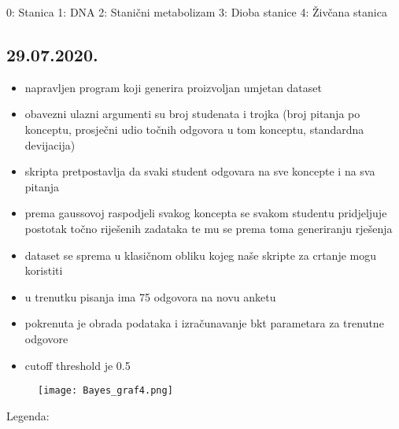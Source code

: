 		0: Stanica
		1: DNA
		2: Stanični metabolizam
		3: Dioba stanice
		4: Živčana stanica

		\subsection{29.07.2020.}
		\begin{itemize}
			\item napravljen program koji generira proizvoljan umjetan dataset
			\item obavezni ulazni argumenti su broj studenata i trojka (broj pitanja po konceptu, prosječni udio točnih odgovora u tom konceptu, standardna devijacija)
			\item skripta pretpostavlja da svaki student odgovara na sve koncepte i na sva pitanja
			\item prema gaussovoj raspodjeli svakog koncepta se svakom studentu pridjeljuje postotak točno riješenih zadataka te mu se prema toma generiranju rješenja
			\item dataset se sprema u klasičnom obliku kojeg naše skripte za crtanje mogu koristiti
			\item u trenutku pisanja ima 75 odgovora na novu anketu
			\item pokrenuta je obrada podataka i izračunavanje bkt parametara za trenutne odgovore
			\item cutoff threshold je 0.5
		\end{itemize}
		\begin{figure}[!htb]
			\centering
			\texttt{[image: Bayes\_graf4.png]}
			\caption{}
			\label{}
		\end{figure}
		Legenda:
		
